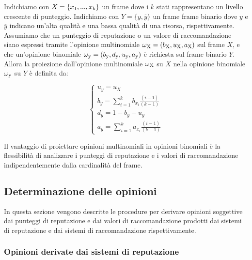 \documentclass{report}
\begin{document}
	Indichiamo con $X=\{x\textsubscript{1},...,x\textsubscript{k}\}$ un frame dove i $k$ stati rappresentano un
	livello crescente di punteggio. Indichiamo con $Y=\{y,\overline{y}\}$ un frame
	frame binario dove $y$ e $\overline{y}$ indicano un'alta qualità e una bassa qualità
	di una risorsa, rispettivamente. Assumiamo che un punteggio di
	reputazione o un valore di raccomandazione siano espressi tramite
	l'opinione multinomiale $\omega\textsubscript{X}=(b\textsubscript{X},u\textsubscript{X},a\textsubscript{X})$ sul frame $X$, e che un'opinione
	binomiale $\omega\textsubscript{y}=(b\textsubscript{y},d\textsubscript{y},u\textsubscript{y},a\textsubscript{y})$ è richiesta sul frame binario $Y$. Allora la
	proiezione dall'opinione multinomiale $\omega\textsubscript{X}$ su $X$ nella opinione
	binomiale $\omega\textsubscript{y}$ su $Y$ è definita da: 
	
	\begin{center}
	\begin{equation}
	\begin{cases}
		u_y=u_X\\
		b_y=\sum_{i=1}^k b_{x_i} \frac{(i-1)}{(k-1)}\\
		d_y=1-b_y-u_y\\
		a_y=\sum_{i=1}^k a_{x_i} \frac{(i-1)}{(k-1)}
	\end{cases} \label{equazione4}
	\end{equation}
	\end{center}
	
	
	Il vantaggio di proiettare opinioni multinomiali in opinioni binomiali è
	la flessibilità di analizzare i punteggi di reputazione e i valori di
	raccomandazione indipendentemente dalla cardinalità del frame.
	
	\hypertarget{header-n96}{%
		\subsection{Determinazione delle opinioni}\label{header-n96}}
	
	In questa sezione vengono descritte le procedure per derivare opinioni
	soggettive dai punteggi di reputazione e dai valori di raccomandazione
	prodotti dai sistemi di reputazione e dai sistemi di raccomandazione
	rispettivamente.
	
	\hypertarget{header-n99}{%
		\subsubsection{Opinioni derivate dai sistemi di
			reputazione}\label{header-n99}}
	
\end{document}
